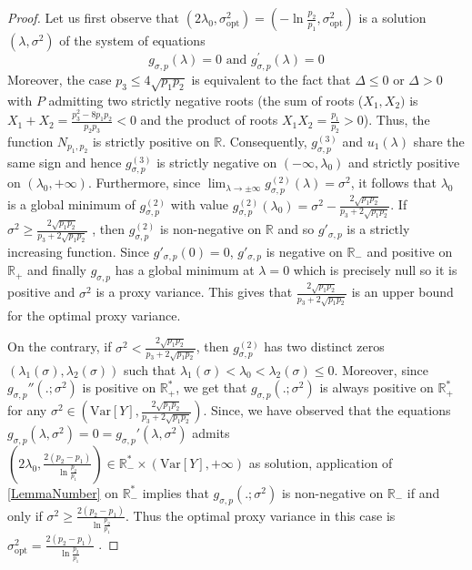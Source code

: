 \documentclass[a4paper, 10pt]{article}
\newcommand{\beq}{\begin{equation}}
\newcommand{\eeq}{\end{equation}}
\theoremstyle{definition}
\begin{document}
\begin{proof}Let us first observe that $\left(2\lambda_0,\sigma_{\text{opt}}^2\right)=\left(-\ln\frac{p_2}{p_1},\sigma_{\text{opt}}^2\right)$ is a solution $(\lambda,\sigma^2)$ of the system of equations
\beq g_{\sigma,p}(\lambda)=0 \text{ and } g^{'}_{\sigma,p}(\lambda) = 0\eeq
Moreover, the case $p_3\leq 4\sqrt{p_1p_2}$ is equivalent to the fact that $\Delta\leq 0$ or $\Delta>0$ with $P$ admitting two strictly negative roots (the sum of roots ($X_1,X_2)$ is $X_1+X_2 = \frac{p_3^2-8p_1p_2}{p_2p_3} < 0$ and the product of roots $X_1 X_2 = \frac{p_1}{p_2}>0$). Thus, the function $N_{p_1,p_2}$ is strictly positive on $\mathbb{R}$. Consequently, $g^{(3)}_{\sigma,p}$ and $u_1(\lambda)$ share the same sign and hence $g_{\sigma,p}^{(3)}$ is strictly negative on $(-\infty,\lambda_0)$ and strictly positive on $(\lambda_{0}, +\infty)$. Furthermore, since $\lim_{\lambda\to \pm \infty} g^{(2)}_{\sigma, p}(\lambda)=\sigma^2$, it follows that $\lambda_0$ is a global minimum of $g^{(2)}_{\sigma, p}$ with value $g^{(2)}_{\sigma,p}(\lambda_{0})=\sigma^2-\frac{2\sqrt{p_1p_2}}{p_3+2\sqrt{p_1p_2}}$. If $\sigma^2\geq\frac{2\sqrt{p_1p_2}}{p_3+2\sqrt{p_1p_2}}$ , then $g^{(2)}_{\sigma,p}$ is non-negative on $\mathbb{R}$ and so $g'_{\sigma,p}$ is a strictly increasing function. Since $g'_{\sigma,p}(0)=0$, $g'_{\sigma,p}$ is negative on $\mathbb{R}_-$ and positive on $\mathbb{R}_+$ and finally $g_{\sigma,p}$ has a global minimum at $\lambda=0$ which is precisely null so it is positive and $\sigma^2$ is a proxy variance. This gives that $\frac{2\sqrt{p_1p_2}}{p_3+2\sqrt{p_1p_2}}$ is an upper bound for the optimal proxy variance. 

On the contrary, if $\sigma^2<\frac{2\sqrt{p_1p_2}}{p_3+2\sqrt{p_1p_2}}$, then $g^{(2)}_{\sigma, p}$ has two distinct zeros $(\lambda_1(\sigma),\lambda_2(\sigma))$ such that $\lambda_1(\sigma)<\lambda_0<\lambda_2(\sigma)\leq 0$. Moreover, since $g_{\sigma,p}''(.;\sigma^2)$ is positive on $\mathbb{R}_+^*$, we get that $g_{\sigma,p}(.;\sigma^2)$ is always positive on $\mathbb{R}_+^*$ for any $\sigma^2\in \left(\text{Var}[Y],\frac{2\sqrt{p_1p_2}}{p_3+2\sqrt{p_1p_2}} \right) $. Since, we have observed that the equations $g_{\sigma,p}(\lambda,\sigma^2)=0=g_{\sigma,p}'(\lambda,\sigma^2)$ admits $\left(2\lambda_0,\frac{2(p_2-p_1)}{\ln \frac{p_2}{p_1}}\right)\in \mathbb{R}_-^*\times \left(\text{Var}[Y],+\infty\right)$ as solution, application of \autoref{LemmaNumber} on $\mathbb{R}_-^*$ implies that $g_{\sigma,p}(.;\sigma^2)$ is non-negative on $\mathbb{R}_-$ if and only if $\sigma^2\geq \frac{2(p_2-p_1)}{\ln \frac{p_2}{p_1}} $. Thus the optimal proxy variance in this case is $\sigma_{\text{opt}}^2= \frac{2(p_2-p_1)}{\ln \frac{p_2}{p_1}}$ . 


\end{proof}
\end{document}
